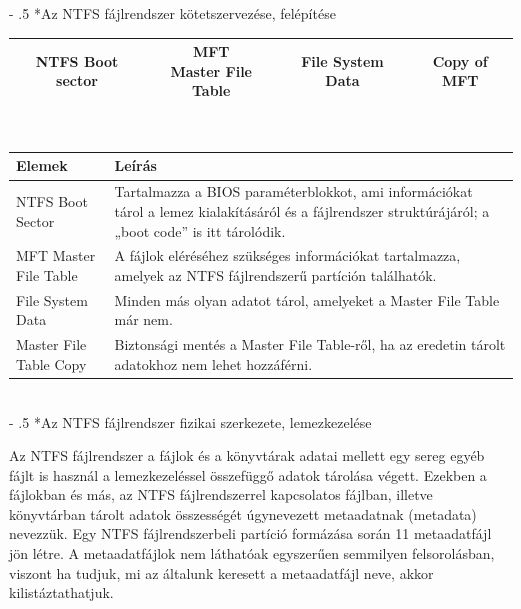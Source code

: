 \documentclass[tikz,12pt,margin=0px]{article}
\makeatletter
\renewcommand\paragraph{%
	\@startsection{paragraph}{4}{0mm}%
	{-\baselineskip}%
	{.5\baselineskip}%
	{\normalfont\normalsize\bfseries}}
\makeatother
\begin{document}
    \paragraph*{Az NTFS fájlrendszer kötetszervezése, felépítése}

    \begin{centering}
        \renewcommand{\arraystretch}{2}
        {\footnotesize
          \begin{tabular}{|c|c|c|c|} \hline
          \textbf{NTFS Boot sector} & \makecell{\textbf{MFT} \\ Master File Table} & \textbf{File System Data} & \textbf{Copy of MFT} \\ \hline
      \end{tabular}
  }
  \renewcommand{\arraystretch}{1}\\
    \end{centering}

    \noindent \renewcommand{\arraystretch}{2}
    {\footnotesize
      \begin{tabular}{|p{6cm}|p{9cm}|}
      \hline
        \textbf{Elemek} & \textbf{Leírás} \\ \hline \hline
        NTFS Boot Sector & Tartalmazza a BIOS paraméterblokkot, ami információkat tárol a lemez kialakításáról és a fájlrendszer struktúrájáról; a „boot code” is itt tárolódik. \\ \hline
        MFT Master File Table & A fájlok eléréséhez szükséges információkat tartalmazza, amelyek az NTFS fájlrendszerű partíción találhatók. \\ \hline
        File System Data & Minden más olyan adatot tárol, amelyeket a Master File Table már nem. \\ \hline
        Master File Table Copy & Biztonsági mentés a Master File Table-ről, ha az eredetin tárolt adatokhoz nem lehet hozzáférni. \\ \hline
      \end{tabular}
  }
  \renewcommand{\arraystretch}{1}\\

    \paragraph*{Az NTFS fájlrendszer fizikai szerkezete, lemezkezelése}

    \noindent Az NTFS fájlrendszer a fájlok és a könyvtárak adatai mellett egy sereg egyéb fájlt is használ a lemezkezeléssel összefüggő adatok tárolása végett. Ezekben a fájlokban és más, az NTFS fájlrendszerrel kapcsolatos fájlban, illetve könyvtárban tárolt adatok összességét úgynevezett metaadatnak (metadata) nevezzük. Egy NTFS fájlrendszerbeli partíció formázása során 11 metaadatfájl jön létre. A metaadatfájlok nem láthatóak egyszerűen semmilyen felsorolásban, viszont ha tudjuk, mi az általunk keresett a metaadatfájl neve, akkor kilistáztathatjuk.\\
\end{document}
